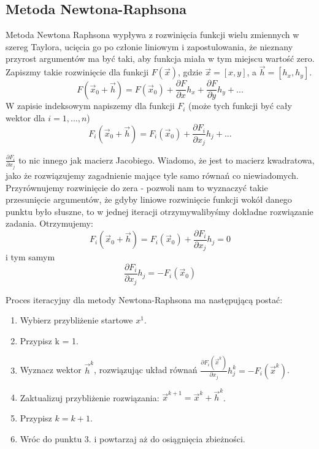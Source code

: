 \documentclass{instrukcja}
\begin{document}
\subsection*{Metoda Newtona-Raphsona}
Metoda Newtona Raphsona wypływa z rozwinięcia funkcji wielu zmiennych w szereg Taylora, ucięcia go po członie liniowym i zapostulowania, że nieznany przyrost argumentów ma być taki, aby funkcja miała w tym miejscu wartość zero. Zapiszmy takie rozwinięcie dla funkcji $F(\vec x)$, gdzie $\vec x = [x,y]$, a $\vec h = [h_x, h_y]$.
\begin{displaymath}
F(\vec x_0 + \vec h) = F(\vec x_0) + \frac{\partial F}{\partial x} h_x + \frac{\partial F}{\partial y} h_y + ...
\end{displaymath}
W zapisie indeksowym napiszemy dla funkcji $F_i$ (może tych funkcji być cały wektor dla $i = 1,...,n$)
\begin{displaymath}
F_i(\vec x_0 + \vec h) = F_i(\vec x_0) + \frac{\partial F_i}{\partial x_j} h_j + ...
\end{displaymath}

$\frac{\partial F_i}{\partial x_j}$ to nic innego jak macierz Jacobiego. Wiadomo, że jest to macierz kwadratowa, jako że rozwiązujemy zagadnienie mające tyle samo równań co niewiadomych. Przyrównujemy rozwinięcie do zera - pozwoli nam to wyznaczyć takie przesunięcie argumentów, że gdyby liniowe rozwinięcie funkcji wokół danego punktu było słuszne, to w jednej iteracji otrzymywalibyśmy dokładne rozwiązanie zadania. Otrzymujemy:
\begin{displaymath}
F_i(\vec x_0 + \vec h) = F_i(\vec x_0) + \frac{\partial F_i}{\partial x_j} h_j = 0
\end{displaymath}
i tym samym
\begin{displaymath}
\frac{\partial F_i}{\partial x_j} h_j = - F_i(\vec x_0)
\end{displaymath}

Proces iteracyjny dla metody Newtona-Raphsona ma następującą postać:
\begin{enumerate}
\item Wybierz przybliżenie startowe {\it $x^1$}.
\item Przypisz k = 1.
\item Wyznacz wektor $\vec h^k$, rozwiązując układ równań $\frac{\partial F_i(\vec x^k)}{\partial x_j} h_j^k = - F_i(\vec x^k)$.
\item Zaktualizuj przybliżenie rozwiązania: $\vec x^{k+1} = \vec x^k + \vec h^k$.
\item Przypisz $k = k+1$.
\item Wróc do punktu 3. i powtarzaj aż do osiągnięcia zbieżności.
\end{enumerate}
\end{document}

